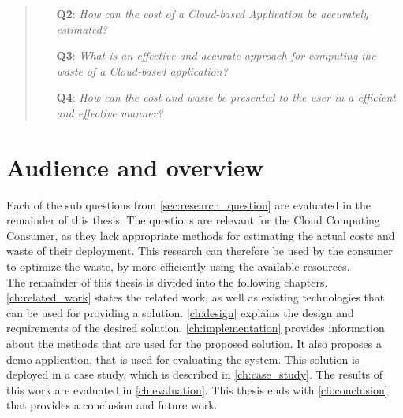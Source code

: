\begin{quote}
    \begin{itemize}
        \item[\textbf{Q2}: ]\textit{How can the cost of a Cloud-based Application be accurately estimated?}
        \item[\textbf{Q3}: ]\textit{What is an effective and accurate approach for computing the waste of a Cloud-based application?}
        \item[\textbf{Q4}: ]\textit{How can the cost and waste be presented to the user in a efficient and effective manner?}
    \end{itemize}
\end{quote}

\section{Audience and overview} \label{sec:audience}
Each of the sub questions from \autoref{sec:research_question} are evaluated in the remainder of this thesis. The questions are relevant for the Cloud Computing Consumer, as they lack appropriate methods for estimating the actual costs and waste of their deployment. This research can therefore be used by the consumer to optimize the waste, by more efficiently using the available resources. \\

\noindent
The remainder of this thesis is divided into the following chapters. \autoref{ch:related_work} states the related work, as well as existing technologies that can be used for providing a solution. \autoref{ch:design} explains the design and requirements of the desired solution. \autoref{ch:implementation} provides information about the methods that are used for the proposed solution. It also proposes a demo application, that is used for evaluating the system. This solution is deployed in a case study, which is described in \autoref{ch:case_study}.
The results of this work are evaluated in \autoref{ch:evaluation}. This thesis ends with \autoref{ch:conclusion} that provides a conclusion and future work.